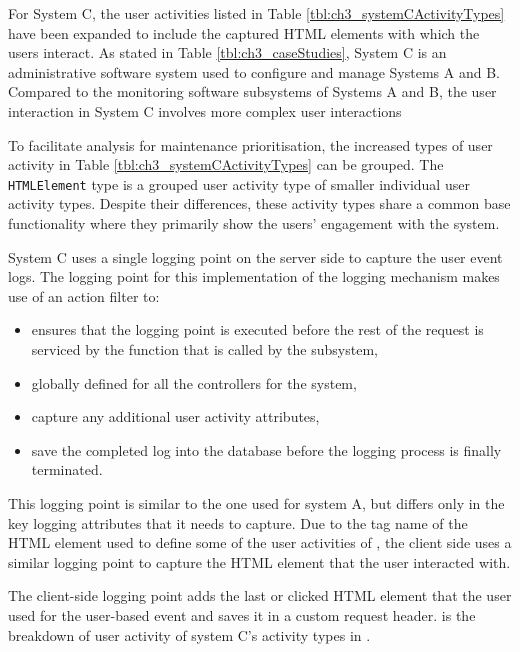 For System C, the user activities listed in Table \ref{tbl:ch3_systemCActivityTypes} have been expanded to include the captured HTML elements with which the users interact. As stated in Table \ref{tbl:ch3_caseStudies}, System C is an administrative software system used to configure and manage Systems A and B. Compared to the monitoring software subsystems of Systems A and B, the user interaction in System C involves more complex user interactions\par To facilitate analysis for maintenance prioritisation, the increased types of user activity in Table \ref{tbl:ch3_systemCActivityTypes} can be grouped. The \texttt{HTMLElement} type is a grouped user activity type of smaller individual user activity types. Despite their differences, these activity types share a common base functionality where they primarily show the users' engagement with the system.\par System C uses a single logging point on the server side to capture the user event logs. The logging point for this implementation of the logging mechanism makes use of an action filter to:

\begin{itemize}
	\item ensures that the logging point is executed before the rest of the request is serviced by the function that is called by the subsystem,
	\item globally defined for all the controllers for the system,
	\item capture any additional user activity attributes,
	\item save the completed log into the database before the logging process is finally terminated.
\end{itemize}

This logging point is similar to the one used for system A, but differs only in the key logging attributes that it needs to capture. Due to the tag name of the HTML element used to define some of the user activities of , the client side uses a similar logging point to capture the HTML element that the user interacted with.\par The client-side logging point adds the last or clicked HTML element that the user used for the user-based event and saves it in a custom request header.  is the breakdown of user activity of system C's activity types in .

